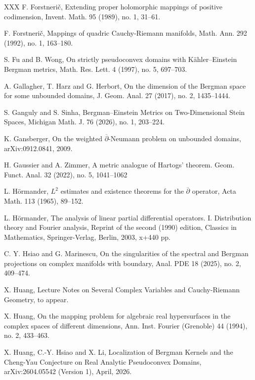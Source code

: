 \documentclass[a4paper,centertags,oneside,12pt]{amsart}
\numberwithin{equation}{section}
\begin{document}
\begin{thebibliography}{XXX}
 F. Forstneri\v{c}, Extending proper holomorphic mappings of positive codimension, Invent. Math. 95 (1989), no. 1, 31--61.

 F. Forstneri\v{c}, Mappings of quadric Cauchy-Riemann manifolds, Math. Ann. 292 (1992), no. 1, 163--180.

 S. Fu and B. Wong, On strictly pseudoconvex domains with K\"ahler--Einstein Bergman metrics, Math. Res. Lett. 4 (1997), no. 5, 697--703.

 A. Gallagher, T. Harz and G. Herbort, On the dimension of the Bergman space for some unbounded domains, J. Geom. Anal. 27 (2017), no. 2, 1435--1444.

 S. Ganguly and S. Sinha, Bergman--Einstein Metrics on Two-Dimensional Stein Spaces, Michigan Math. J. 76 (2026), no. 1, 203--224.

 K. Gansberger, On the weighted $\overline\partial$-Neumann problem on unbounded domains, arXiv:0912.0841, 2009.

 H. Gaussier and A. Zimmer, A metric analogue of Hartogs' theorem. Geom. Funct. Anal. 32 (2022), no. 5, 1041--1062

 L. H\"ormander, $L^2$ estimates and existence theorems for the $\overline\partial$ operator, Acta Math. 113 (1965), 89--152.

 L. H\"ormander, The analysis of linear partial differential operators. I. Distribution theory and Fourier analysis, Reprint of the second (1990) edition, Classics in Mathematics, Springer-Verlag, Berlin, 2003, x+440 pp.

 C. Y. Hsiao and G. Marinescu, On the singularities of the spectral and Bergman projections on complex manifolds with boundary, Anal. PDE 18 (2025), no. 2, 409--474.

 X. Huang, Lecture Notes on Several Complex Variables and Cauchy-Riemann Geometry, to appear.

 X. Huang, On the mapping problem for algebraic real hypersurfaces in the complex spaces of different dimensions, Ann. Inst. Fourier (Grenoble) 44 (1994), no. 2, 433--463.

 X. Huang, C.-Y. Hsiao and X. Li, Localization of Bergman Kernels and the Cheng-Yau Conjecture on Real Analytic Pseudoconvex Domains, arXiv:2604.05542 (Version 1), April, 2026. 


\end{thebibliography}
\end{document}
